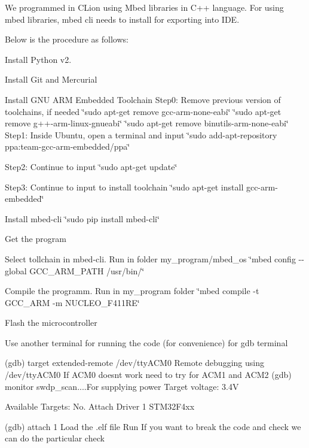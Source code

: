 We programmed in C\+Lion using Mbed libraries in C++ language. For using mbed libraries, mbed cli needs to install for exporting into I\+DE.

Below is the procedure as follows\+:


\begin{DoxyEnumerate}
\item Install Python v2.
\item Install Git and Mercurial
\item Install G\+NU A\+RM Embedded Toolchain Step0\+: Remove previous version of toolchains, if needed \char`\"{}sudo apt-\/get remove gcc-\/arm-\/none-\/eabi\char`\"{} \char`\"{}sudo apt-\/get remove g++-\/arm-\/linux-\/gnueabi\char`\"{} \char`\"{}sudo apt-\/get remove binutils-\/arm-\/none-\/eabi\char`\"{} Step1\+: Inside Ubuntu, open a terminal and input \char`\"{}sudo add-\/apt-\/repository ppa\+:team-\/gcc-\/arm-\/embedded/ppa\char`\"{}
\end{DoxyEnumerate}

Step2\+: Continue to input \char`\"{}sudo apt-\/get update\char`\"{}

Step3\+: Continue to input to install toolchain \char`\"{}sudo apt-\/get install gcc-\/arm-\/embedded\char`\"{}
\begin{DoxyEnumerate}
\item Install mbed-\/cli \char`\"{}sudo pip install mbed-\/cli\char`\"{}
\item Get the program
\item Select tollchain in mbed-\/cli. Run in folder my\+\_\+program/mbed\+\_\+os \char`\"{}mbed config -\/-\/global G\+C\+C\+\_\+\+A\+R\+M\+\_\+\+P\+A\+T\+H /usr/bin/\char`\"{}
\item Compile the programm. Run in my\+\_\+program folder \char`\"{}mbed compile -\/t G\+C\+C\+\_\+\+A\+R\+M -\/m N\+U\+C\+L\+E\+O\+\_\+\+F411\+R\+E\char`\"{}
\item Flash the microcontroller
\end{DoxyEnumerate}

Use another terminal for running the code (for convenience) for gdb terminal

(gdb) target extended-\/remote /dev/tty\+A\+C\+M0 Remote debugging using /dev/tty\+A\+C\+M0 If A\+C\+M0 doesnt work need to try for A\+C\+M1 and A\+C\+M2 (gdb) monitor swdp\+\_\+scan....For supplying power Target voltage\+: 3.\+4V

Available Targets\+: No. Attach Driver 1 S\+T\+M32\+F4xx

(gdb) attach 1 Load the .elf file Run If you want to break the code and check we can do the particular check

